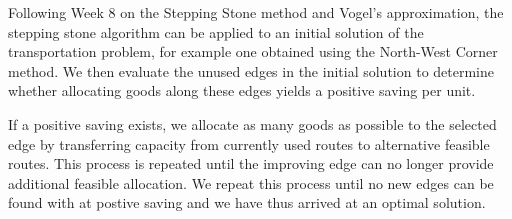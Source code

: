 Following Week 8 on the Stepping Stone method and Vogel’s approximation, the stepping stone algorithm can be applied to an initial solution of the transportation problem, for example one obtained using the North-West Corner method. We then evaluate the unused edges in the initial solution to determine whether allocating goods along these edges yields a positive saving per unit.

If a positive saving exists, we allocate as many goods as possible to the selected edge by transferring capacity from currently used routes to alternative feasible routes. This process is repeated until the improving edge can no longer provide additional feasible allocation. We repeat this process until no new edges can be found with at postive saving
and we have thus arrived at an optimal solution.